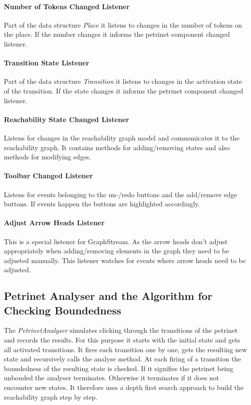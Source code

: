\documentclass[10pt, a4paper]{article}
\begin{document}
\paragraph{Number of Tokens Changed Listener} Part of the data structure \textit{Place} it listens to changes in the number of tokens on the place. If the number changes it informs the petrinet component changed listener. 
\paragraph{Transition State Listener} Part of the data structure \textit{Transition} it listens to changes in the activation state of the transition. If the state changes it informs the petrinet component changed listener.
\paragraph{Reachability State Changed Listener} Listens for changes in the reachability graph model and communicates it to the reachability graph. It contains methods for adding/removing states and also methods for modifying edges.
\paragraph{Toolbar Changed Listener} Listens for events belonging to the un-/redo buttons and the add/remove edge buttons. If events happen the buttons are highlighted accordingly.
\paragraph{Adjust Arrow Heads Listener} This is a special listener for GraphStream. As the arrow heads don't adjust appropriately when adding/removing elements in the graph they need to be adjusted manually. This listener watches for events where arrow heads need to be adjusted.

\subsection{Petrinet Analyser and the Algorithm for Checking Boundedness}
\label{label:algorithm}



The \textit{PetrinetAnalyser} simulates clicking through the transitions of the petrinet and records the results. For this purpose it starts with the initial state and gets all activated transitions. It fires each transition one by one, gets the resulting new state and recursively calls the analyse method. At each firing of a transition the boundedness of the resulting state is checked. If it signifies the petrinet being unbouded the analyser terminates. Otherwise it terminates if it does not encounter new states. It therefore uses a depth first search approach to build the reachability graph step by step.
\end{document}
